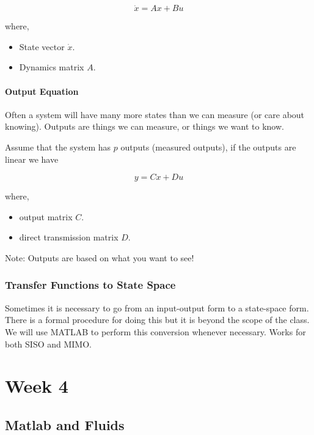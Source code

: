 \documentclass[12pt, a4paper]{report}
\begin{document}
  \begin{equation}
    \dot x = Ax + Bu
  \end{equation}

  where,

  \begin{itemize}
    \item State vector $ \dot x. $
    \item Dynamics matrix $ A. $
  \end{itemize}

  \subsection{Output Equation}

  Often a system will have many more states than we can measure (or care about knowing). Outputs are things we can measure, or things we want to know.

  Assume that the system has $ p $ outputs (measured outputs), if the outputs are linear we have

  \begin{equation}
    y = Cx + Du
  \end{equation}

  where,

  \begin{itemize}
    \item output matrix $ C. $
    \item direct transmission matrix $ D. $
  \end{itemize}

  Note: Outputs are based on what you want to see!

  \section{Transfer Functions to State Space}

  Sometimes it is necessary to go from an input-output form to a state-space form. There is a formal procedure for doing this but it is beyond the scope of the class. We will use MATLAB to perform this conversion whenever necessary. Works for both SISO and MIMO.

  \part{Week 4}

  \chapter{Matlab and Fluids}
\end{document}
